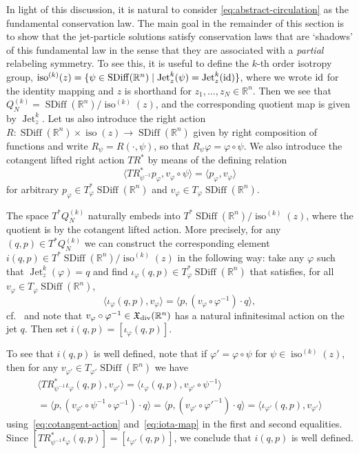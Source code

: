 \documentclass[12pt]{amsart}
\newcommand{\R}{\ensuremath{\mathbb{R}}}
\DeclareMathOperator{\SDiff}{SDiff}
\DeclareMathOperator{\Jet}{Jet}
\DeclareMathOperator{\iso}{iso}
\begin{document}
In light of this discussion, it is natural to consider \eqref{eq:abstract-circulation} as the  fundamental conservation law. The main goal in the remainder of this section is to show that the jet-particle solutions satisfy conservation laws that are `shadows' of this fundamental law in the sense that they are associated with a \emph{partial} relabeling symmetry. To see this, it is useful to define the $k$-th order isotropy group,
$\iso^{(k)}(z) = \{ \psi \in \SDiff(\R^n) \mid \Jet^{k}_z( \psi) = \Jet^k_z (\rm{id}) \}$, where we wrote $\rm{id}$ for the identity mapping and $z$ is shorthand for $z_1, \ldots, z_N \in \mathbb{R}^n$.
Then we see that $Q^{(k)}_N = \SDiff(\R^n) / \iso^{(k)}(z)$, and the corresponding quotient map is given by $\Jet_z^k$.
 Let us also introduce the right action $R\colon \SDiff(\R^n) \times \iso(z) \to \SDiff(\R^n)$ given by right composition of functions and write $R_\psi = R(\cdot , \psi)$, so that $R_\psi \varphi = \varphi \circ \psi$. We also introduce the cotangent lifted right action $TR^*$ by means of the defining relation
 \begin{equation}\label{eq:cotangent-action}
 	\langle TR^*_{\psi^{-1}}p_\varphi, v_\varphi \circ \psi \rangle = \langle p_\varphi, v_\varphi\rangle
 \end{equation}
 for arbitrary $p_\varphi \in T_\varphi^*\SDiff(\R^n)$ and $v_\varphi \in T_\varphi\SDiff(\R^n)$.

 The space $T^*Q^{(k)}_N$ naturally embeds into $T^*\SDiff(\R^n) / \iso^{(k)}(z)$, where the quotient is by the cotangent lifted action. More precisely, for any $(q,p) \in T^*Q^{(k)}_N$ we can construct the corresponding element $i(q,p) \in T^*\SDiff(\R^n) / \iso^{(k)}(z)$ in the following way: take any $\varphi$ such that $\Jet_z^k(\varphi) = q$ and find $\iota_\varphi(q,p) \in T_\varphi^*\SDiff(\R^n)$ that satisfies, for all $v_\varphi \in T_\varphi \SDiff(\mathbb{R}^n)$,
 \begin{equation}\label{eq:iota-map}
   \langle \iota_\varphi(q,p) , v_\varphi \rangle = \langle p , (v_\varphi \circ \varphi^{-1}) \cdot q \rangle,
 \end{equation}
 cf.~\cite[(2.2.4)]{HRS} and note that $v_\varphi \circ \varphi^{-1} \in \mathfrak{X}_{\rm div}(\R^n)$ has a natural infinitesimal action on the jet $q$.
 Then set $i(q,p) = [\iota_\varphi(q,p)]$.

 To see that $i(q,p)$ is well defined, note that if $\varphi' = \varphi \circ \psi$ for $\psi \in \iso^{(k)}(z)$, then for any $v_{\varphi'} \in T_{\varphi'} \SDiff(\R^n)$ we have
 \begin{multline*}
   \langle TR^*_{\psi^{-1}} \iota_\varphi(q,p), v_{\varphi'} \rangle
 = \langle \iota_\varphi(q,p), v_{\varphi'} \circ \psi^{-1} \rangle\\
 = \langle p, (v_{\varphi'} \circ \psi^{-1} \circ \varphi^{-1}) \cdot q \rangle
 = \langle p, (v_{\varphi'} \circ {\varphi'}^{-1}) \cdot q \rangle
 = \langle \iota_{\varphi'}(q,p), v_{\varphi'} \rangle
 \end{multline*}
 using~\eqref{eq:cotangent-action} and~\eqref{eq:iota-map} in the first and second equalities.
 Since $[TR^*_{\psi^{-1}} \iota_\varphi(q,p)] = [\iota_{\varphi'}(q,p)]$, we conclude that $i(q,p)$ is well defined.
\end{document}
